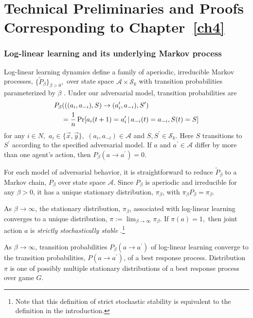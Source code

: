 \chapter{Technical Preliminaries and Proofs Corresponding to Chapter~\ref{ch4}}

\subsection{Log-linear learning and its underlying Markov process}\label{a:LLL Markov}

Log-linear learning dynamics define a family of aperiodic, irreducible Markov processes, $\{\tilde{P}_\beta\}_{\beta>0},$ over state space $\mathcal{A}\times\mathcal{S}_k$ with transition probabilities parameterized by $\beta$ \cite{Blume1993}. Under our adversarial model, transition probabilities are
\begin{align}
&P_\beta(((a_i,a_{-i}), S)\to (a_i^\prime,a_{-i}),S^\prime)\nonumber\\
&\hspace{0.15in} = {1\over n}\Pr[a_i(t+1) = a_i^\prime\,|\,a_{-i}(t) = a_{-i}, S(t) = S]
\end{align}
for any $i\in N,$ $a_i\in \{\vec{x},\vec{y}\},$  $(a_i,a_{-i})\in\mathcal{A}$ and $S,S^\prime\in\mathcal{S}_k$. Here $S$ transitions to $S^\prime$ according to the specified adversarial model. If $a$ and $a^\prime\in\mathcal{A}$ differ by more than one agent's action, then $P_\beta(a\to a^\prime) = 0$. 

For each model of adversarial behavior, it is straightforward to reduce $\tilde{P}_\beta$ to a Markov chain, $P_\beta$ over state space $\mathcal{A}$.
Since $P_\beta$  is aperiodic and irreducible for any $\beta >0$, it has a unique stationary distribution, $\pi_\beta$, with $\pi_\beta P_\beta = \pi_\beta$. 

As $\beta\to\infty$, the stationary distribution, $\pi_\beta$, associated with log-linear learning converges to a unique distribution,
$\pi := \lim_{\beta\to\infty} \pi_\beta.$  
If %
$\pi(a) = 1,$ then joint action $a$ is \emph{strictly stochastically stable} \cite{Foster1990}.\footnote{Note that this definition of strict stochastic stability is equivalent to the definition  in the introduction.}


As $\beta\to \infty$, transition probabilities $P_\beta(a\to a^\prime)$ of  log-linear learning converge to the transition probabilities, $P(a\to a^\prime)$, of a best response process.  
Distribution $\pi$ is one of possibly multiple stationary distributions of a best response process over game $G$. %


